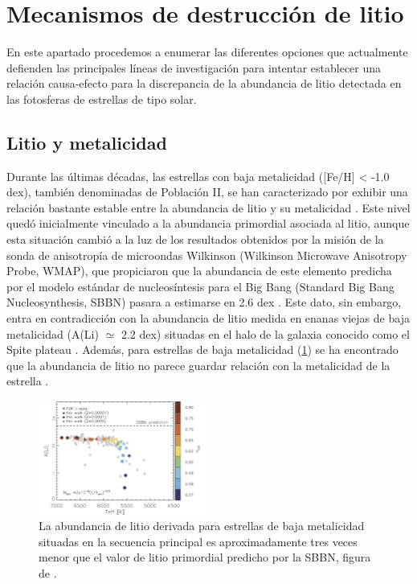 \section{Mecanismos de destrucción de litio}
En este apartado procedemos a enumerar las diferentes opciones que actualmente defienden las principales líneas de investigación para intentar establecer una relación causa-efecto para la discrepancia de la abundancia de litio detectada en las fotosferas de estrellas de tipo solar.\par

\subsection{Litio y metalicidad}
Durante las últimas décadas, las estrellas con baja metalicidad ([Fe/H] < -1.0 dex), también denominadas de Población II, se han caracterizado por exhibir una relación bastante estable entre la abundancia de litio y su metalicidad \citep{Guiglion2016}. Este nivel quedó inicialmente vinculado a la abundancia primordial asociada al litio, aunque esta situación cambió a la luz de los resultados obtenidos por la misión de la sonda de anisotropía de microondas Wilkinson (Wilkinson Microwave Anisotropy Probe, WMAP), que propiciaron que la abundancia de este elemento predicha por el modelo estándar de nucleosíntesis para el Big Bang (Standard Big Bang Nucleosynthesis, SBBN) pasara a estimarse en 2.6 dex \citep{Spergel2003}. Este dato, sin embargo, entra en contradicción con la abundancia de litio medida en enanas viejas de baja metalicidad  (A(Li) $\simeq$ 2.2 dex) situadas en el halo de la galaxia conocido como el Spite plateau \citep{Spite1982}. Además, para estrellas de baja metalicidad (\ref{fig:li_abundances_sbbn}) se ha encontrado que la abundancia de litio no parece guardar relación con la metalicidad de la estrella \citep{Fu2015}.\par


\begin{figure}
	\centering
	\includegraphics[width=0.5\textwidth]{img/tesis/li_abundances_sbbn.pdf}
	\caption{La abundancia de litio derivada para estrellas de baja metalicidad situadas en la secuencia principal es aproximadamente tres veces menor que el valor de litio primordial predicho por la SBBN, figura de \cite{Fu2015}.}
	\label{fig:li_abundances_sbbn}
\end{figure}

